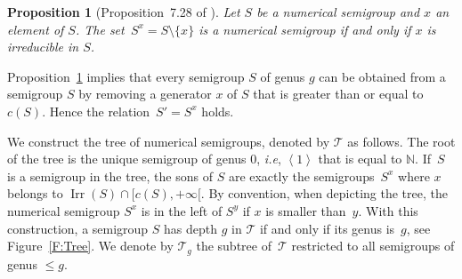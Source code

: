 \documentclass[reqno]{amsart}
\theoremstyle{plain}
\newtheorem{prop}{Proposition}[section]
\theoremstyle{definition}
\newcommand{\ie}{\emph{i.e.}}
\renewcommand{\leq}{\leqslant}
\newcommand{\NN}{\mathbb{N}}
\renewcommand{\ie}{\emph{i.e}}
\DeclareMathOperator{\Irr}{Irr}
\begin{document}
\begin{prop}[Proposition~7.28 of \cite{BookNS}]
\label{P:Sx}
Let $S$ be a numerical semigroup and $x$ an element of $S$. The set~$S^x=S\setminus\{x\}$ is a numerical semigroup if and only if $x$ is irreducible in $S$.
\end{prop}


Proposition~\ref{P:Sx} implies that every semigroup $S$ of genus $g$ can be obtained from a semigroup $S$ by removing a generator $x$ of $S$ that is greater than or equal to $c(S)$.
Hence the relation~$S'=S^x$ holds.

We construct the tree of numerical semigroups, denoted by $\mathcal{T}$ as follows. 
The root of the tree is the unique semigroup of genus $0$, \ie, $\left<1\right>$ that is equal to $\NN$. 
If~$S$ is a semigroup in the tree,  the sons of $S$ are exactly the semigroups~$S^x$ where $x$ belongs to $\Irr(S)\cap[c(S),+\infty[$. 
By convention, when depicting the tree, the numerical semigroup $S^x$ is in the left of $S^y$ if $x$ is smaller than~$y$. 
With this construction, a semigroup $S$ has depth $g$ in $\mathcal{T}$ if and only if its genus is~$g$, see Figure~\ref{F:Tree}.
We denote by $\mathcal{T}_{g}$ the subtree of~$\mathcal{T}$ restricted to all semigroups of genus $\leq g$.
\end{document}

